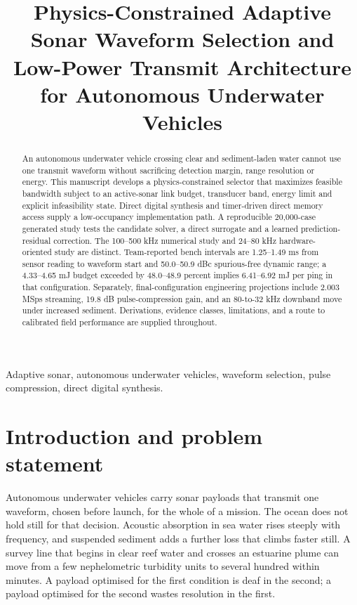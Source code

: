 \documentclass[conference,a4paper]{IEEEtran}
\title{Physics-Constrained Adaptive Sonar Waveform Selection and Low-Power Transmit Architecture for Autonomous Underwater Vehicles}
\author{}
\begin{document}
\maketitle
\pagestyle{fancy}
\thispagestyle{fancy}
\vspace{-10mm}

\begin{abstract}
An autonomous underwater vehicle crossing clear and sediment-laden water cannot use one transmit waveform without sacrificing detection margin, range resolution or energy. This manuscript develops a physics-constrained selector that maximizes feasible bandwidth subject to an active-sonar link budget, transducer band, energy limit and explicit infeasibility state. Direct digital synthesis and timer-driven direct memory access supply a low-occupancy implementation path. A reproducible 20,000-case generated study tests the candidate solver, a direct surrogate and a learned prediction-residual correction. The 100--500 kHz numerical study and 24--80 kHz hardware-oriented study are distinct. Team-reported bench intervals are 1.25--1.49 ms from sensor reading to waveform start and 50.0--50.9 dBc spurious-free dynamic range; a 4.33--4.65 mJ budget exceeded by 48.0--48.9 percent implies 6.41--6.92 mJ per ping in that configuration. Separately, final-configuration engineering projections include 2.003 MSps streaming, 19.8 dB pulse-compression gain, and an 80-to-32 kHz downband move under increased sediment. Derivations, evidence classes, limitations, and a route to calibrated field performance are supplied throughout.
\end{abstract}

\begin{IEEEkeywords}
Adaptive sonar, autonomous underwater vehicles, waveform selection, pulse compression, direct digital synthesis.
\end{IEEEkeywords}

\section{Introduction and problem statement}

Autonomous underwater vehicles carry sonar payloads that transmit one waveform,
chosen before launch, for the whole of a mission. The ocean does not hold still
for that decision. Acoustic absorption in sea water rises steeply with
frequency, and suspended sediment adds a further loss that climbs faster still.
A survey line that begins in clear reef water and crosses an estuarine plume can
move from a few nephelometric turbidity units to several hundred within
minutes. A payload optimised for the first condition is deaf in the second; a
payload optimised for the second wastes resolution in the first.
\end{document}
